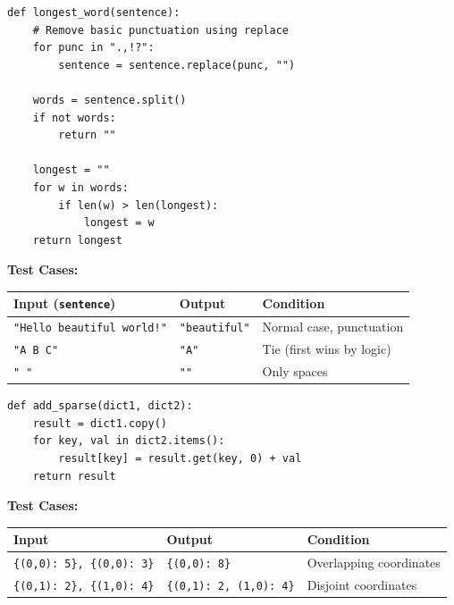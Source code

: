 \begin{solutionbox}
\begin{lstlisting}[language=Python3]
def longest_word(sentence):
    # Remove basic punctuation using replace
    for punc in ".,!?":
        sentence = sentence.replace(punc, "")
    
    words = sentence.split()
    if not words:
        return ""
        
    longest = ""
    for w in words:
        if len(w) > len(longest):
            longest = w
    return longest
\end{lstlisting}
\textbf{Test Cases:}
\begin{table}[H]
    \centering\sffamily
    \begin{tabular}{llp{5cm}}
    \toprule
    \textbf{Input (\texttt{sentence})} & \textbf{Output} & \textbf{Condition} \\
    \midrule
    \texttt{"Hello beautiful world!"} & \texttt{"beautiful"} & Normal case, punctuation \\
    \texttt{"A B C"} & \texttt{"A"} & Tie (first wins by logic) \\
    \texttt{"   "} & \texttt{""} & Only spaces \\
    \bottomrule
    \end{tabular}
\end{table}
\end{solutionbox}

\begin{solutionbox}
\begin{lstlisting}[language=Python3]
def add_sparse(dict1, dict2):
    result = dict1.copy()
    for key, val in dict2.items():
        result[key] = result.get(key, 0) + val
    return result
\end{lstlisting}
\textbf{Test Cases:}
\begin{table}[H]
    \centering\sffamily
    \begin{tabular}{llp{4cm}}
    \toprule
    \textbf{Input} & \textbf{Output} & \textbf{Condition} \\
    \midrule
    \texttt{\{(0,0): 5\}, \{(0,0): 3\}} & \texttt{\{(0,0): 8\}} & Overlapping coordinates \\
    \texttt{\{(0,1): 2\}, \{(1,0): 4\}} & \texttt{\{(0,1): 2, (1,0): 4\}} & Disjoint coordinates \\
    \bottomrule
    \end{tabular}
\end{table}
\end{solutionbox}

